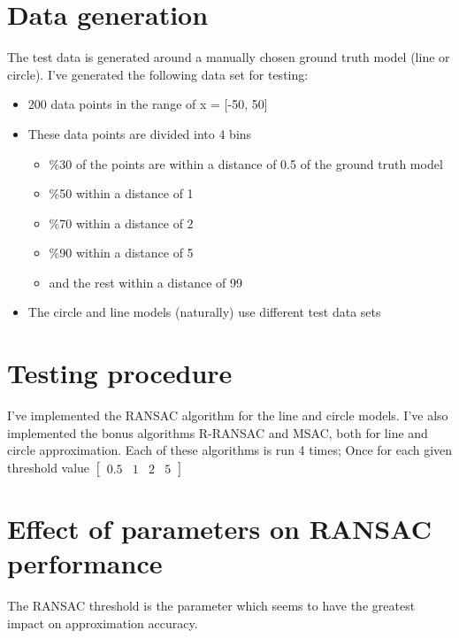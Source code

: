 \section{Data generation}

The test data is generated around a manually chosen ground truth model (line or circle).
I've generated the following data set for testing:
\begin{itemize}
  \item 200 data points in the range of x = [-50, 50]
  \item These data points are divided into 4 bins
    \begin{itemize}
      \item \%30 of the points are within a distance of 0.5 of the ground truth
        model
      \item \%50 within a distance of 1
      \item \%70 within a distance of 2
      \item \%90 within a distance of 5
      \item and the rest within a distance of 99
    \end{itemize}
  \item The circle and line models (naturally) use different test data sets
\end{itemize}

\section{Testing procedure}

I've implemented the RANSAC algorithm for the line and circle models. I've also
implemented the bonus algorithms R-RANSAC and MSAC, both for line and circle
approximation. Each of these algorithms is run 4 times; Once for each given
threshold value
\(
  \begin{bmatrix} 0.5 & 1 & 2 & 5 \end{bmatrix}
\)

\section{Effect of parameters on RANSAC performance}

The RANSAC threshold is the parameter which seems to have the greatest impact
on approximation accuracy. 
